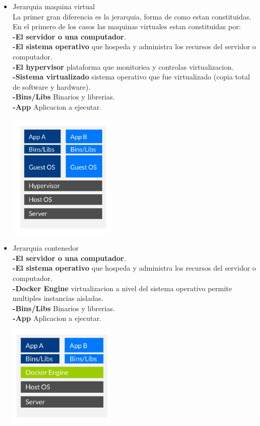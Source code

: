 \documentclass[twoside,twocolumn]{article}
\begin{document}
\begin{itemize}
	\item Jerarquia maquina virtual
	\\La primer gran diferencia es la jerarquia, forma de como estan constituidas. En el primero de los casos las maquinas virtuales estan constituidas por:
	\\ \textbf{-El servidor o una computador}.
	\\ \textbf{-El sistema operativo} que hospeda y administra los recursos del servidor o computador.
	\\ \textbf{-El hypervisor} plataforma que monitoriea y controlas virtualizacion.
	\\ \textbf{-Sistema virtualizado} sistema operativo que fue virtualizado (copia total de software y hardware).
	\\ \textbf{-Bins/Libs} Binarios y librerias.
	\\ \textbf{-App} Aplicacion a ejecutar.
	\begin{center}
	\includegraphics[width=5cm]{./Imagenes/jerarquia1} 
	\end{center}
\end{itemize} 

\begin{itemize}
	\item Jerarquia contenedor
	\\ \textbf{-El servidor o una computador}.
	\\ \textbf{-El sistema operativo} que hospeda y administra los recursos del servidor o computador.
	\\ \textbf{-Docker Engine} virtualizacion a nivel del sistema operativo permite multiples instancias aisladas.
	\\ \textbf{-Bins/Libs} Binarios y librerias.
	\\ \textbf{-App} Aplicacion a ejecutar.
	\begin{center}
	\includegraphics[width=5cm]{./Imagenes/jerarquia2} 
	\end{center}
\end{itemize} 
\end{document}
